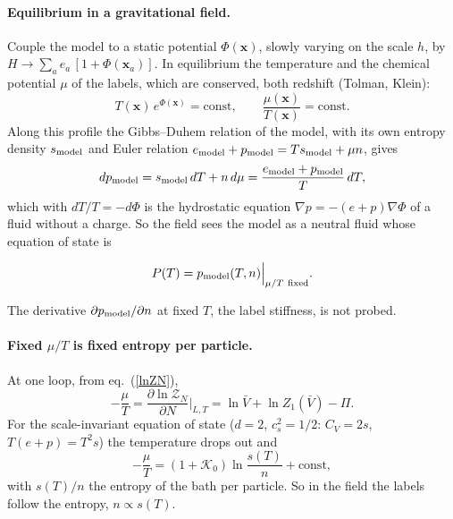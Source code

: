 \documentclass[11pt,aps,preprint,nofootinbib,superscriptaddress,tightenlines]{revtex4-2}
\def\st{\begin{equation}}
\def\stp{\end{equation}}
\def\Eq#1{eq.~(\ref{#1})}
\let\oldparagraph\paragraph
\renewcommand{\paragraph}{\par\bigskip\oldparagraph}
\begin{document}
\paragraph{Equilibrium in a gravitational field.}  Couple the model to a static potential $\Phi(\bm x)$, slowly varying on the scale $h$, by
$H\to\sum_ae_a\,[1+\Phi(\bm x_a)]$.  In equilibrium the temperature and the chemical potential $\mu$ of the labels, which are conserved, both redshift
(Tolman, Klein):
\st
T(\bm x)\,e^{\Phi(\bm x)}=\text{const},\qquad \frac{\mu(\bm x)}{T(\bm x)}=\text{const} .
\stp
Along this profile the Gibbs--Duhem relation of the model, with its own entropy density $s_{\rm model}$ and Euler relation
$e_{\rm model}+p_{\rm model}=Ts_{\rm model}+\mu n$, gives
\st
dp_{\rm model}=s_{\rm model}\,dT+n\,d\mu=\frac{e_{\rm model}+p_{\rm model}}{T}\,dT ,
\stp
which with $dT/T=-d\Phi$ is the hydrostatic equation $\nabla p=-(e+p)\nabla\Phi$ of a fluid without a charge.  So the field sees the model as a
neutral fluid whose equation of state is
\begin{keyeq}
\st
P(T)=p_{\rm model}(T,n)\Big|_{\mu/T\ \text{fixed}} .
\label{Pren}
\stp
\end{keyeq}
The derivative $\partial p_{\rm model}/\partial n$ at fixed $T$, the label stiffness, is not probed.

\paragraph{Fixed $\mu/T$ is fixed entropy per particle.}  At one loop, from \Eq{lnZN},
\st
-\frac\mu T=\frac{\partial\ln\mathcal Z_N}{\partial N}\Big|_{L,T}=\ln\bar V+\ln Z_1(\bar V)-\Pi .
\stp
For the scale-invariant equation of state ($d=2$, $c_s^2=1/2$: $C_V=2s$, $T(e+p)=T^2s$) the temperature drops out and
\st
-\frac\mu T=(1+\mathcal K_0)\ln\frac{s(T)}{n}+\text{const},
\stp
with $s(T)/n$ the entropy of the bath per particle.  So in the field the labels follow the entropy, $n\propto s(T)$.
\end{document}
